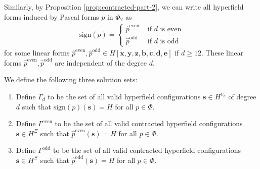 Similarly, by Proposition \ref{prop:contracted-part-2}, we can write all hyperfield forms induced by Pascal forms \( p \) in \( \Phi_2 \) as
\begin{align*}
    \mathrm{sign}(p) = \begin{cases}
        \hat p^{\mathrm{even}} & \text{ if } d \text{ is even} \\
        \hat p^{\mathrm{odd}} & \text{ if } d \text{ is odd}
    \end{cases}
\end{align*}
for some linear forms \( \hat p^{\mathrm{even}}, \hat p^{\mathrm{odd}} \in H[\mathbf{x}, \mathbf{y}, \mathbf{z}, \mathbf{b}, \mathbf{c}, \mathbf{d}, \mathbf{e}] \) if \( d \geq 12 \). These linear forms \( \hat p^{\mathrm{even}}, \hat p^{\mathrm{odd}}  \) are independent of the degree \( d \).

\begin{definition}
    We define the following three solution sets:
    \begin{enumerate}
        \item     Define \( \Gamma_d \) to be the set of all valid hyperfield configurations \( \mathbf{s} \in H^{V_d} \) of degree \( d \) such that \( \mathrm{sign}(p)(\mathbf{s}) = H \) for all \( p \in \Phi \).

        \item     Define \( \Gamma^{\mathrm{even}} \) to be the set of all valid contracted hyperfield configurations \( \mathbf{s} \in H^{\Xi} \) such that \( \hat p^{\mathrm{even}}(\mathbf{s}) = H \) for all \( p \in \Phi \).

        \item     Define \( \Gamma^{\mathrm{odd}} \) to be the set of all valid contracted hyperfield configurations \( \mathbf{s} \in H^{\Xi} \) such that \( \hat p^{\mathrm{odd}}(\mathbf{s}) = H \) for all \( p \in \Phi \).
    \end{enumerate}
\end{definition}